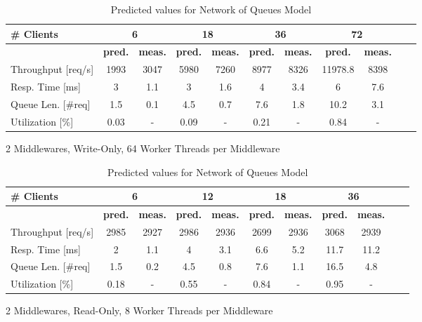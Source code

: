 \documentclass[11pt,a4paper]{article}
\begin{document}
\begin{table}
    \begin{subtable}{1.0\linewidth}\centering
        \begin{tabular}{|l|c|c|c|c|c|c|c|c|c|c|}
        \hline
        \textbf{\# Clients} & \multicolumn{2}{|c|}{\textbf{6}}  & \multicolumn{2}{|c|}{\textbf{18}} & \multicolumn{2}{|c|}{\textbf{36}} & \multicolumn{2}{|c|}{\textbf{72}}\\
        \hline
         & \textbf{pred.} & \textbf{meas.} &  \textbf{pred.} & \textbf{meas.} &  \textbf{pred.} & \textbf{meas.} &  \textbf{pred.} & \textbf{meas.} \\
        \hline
        Throughput [req/s] & 1993 & 3047 & 5980 & 7260 & 8977  & 8326 & 11978.8 & 8398\\
        Resp. Time [ms] & 3 & 1.1 & 3 & 1.6 & 4 & 3.4 & 6 & 7.6\\
        Queue Len. [\#req] & 1.5 & 0.1 & 4.5 & 0.7 & 7.6 & 1.8 & 10.2 & 3.1\\
        Utilization [\%] & 0.03 & - & 0.09 & - & 0.21 & - & 0.84 & -\\
        \hline
        \end{tabular}
    \caption{2 Middlewares, Write-Only, 64 Worker Threads per Middleware}
    \end{subtable}
    

    
    \begin{subtable}{1.0\linewidth}\centering
        \begin{tabular}{|l|c|c|c|c|c|c|c|c|c|c|}
        \hline
        \textbf{\# Clients} & \multicolumn{2}{|c|}{\textbf{6}}  & \multicolumn{2}{|c|}{\textbf{12}} & \multicolumn{2}{|c|}{\textbf{18}} & \multicolumn{2}{|c|}{\textbf{36}}\\
        \hline
         & \textbf{pred.} & \textbf{meas.} &  \textbf{pred.} & \textbf{meas.} &  \textbf{pred.} & \textbf{meas.} &  \textbf{pred.} & \textbf{meas.} \\
        \hline
        Throughput [req/s]  & 2985 & 2927 & 2986 & 2936 & 2699 & 2936 & 3068 & 2939\\
        Resp. Time [ms]  & 2 & 1.1 & 4 & 3.1 & 6.6 & 5.2 & 11.7 & 11.2\\
        Queue Len. [\#req] & 1.5 & 0.2 & 4.5 & 0.8 & 7.6 & 1.1 & 16.5 & 4.8\\
        Utilization [\%] & 0.18 & - & 0.55 & - & 0.84 & - & 0.95 & -\\
        \hline
        \end{tabular}
    \caption{2 Middlewares, Read-Only, 8 Worker Threads per Middleware }
    \end{subtable}
    \caption{Predicted values for Network of Queues Model}
    \label{Table:NetworkOfQueues}
\end{table}
\end{document}
